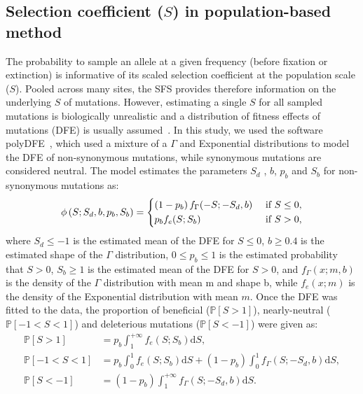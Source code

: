 \documentclass{article}
\newcommand{\der}{\textrm{d}}
\newcommand{\proba}{\mathbb{P}}
\newcommand{\Spop}{S}
\newcommand{\polyDel}{\Spop < -1}
\newcommand{\polyNeutral}{-1 < \Spop < 1}
\newcommand{\polyAdv}{ \Spop > 1}
\newcommand{\PpolyDel}{\proba \left[ \polyDel \right]}
\newcommand{\PpolyNeutral}{\proba \left[ \polyNeutral \right]}
\newcommand{\PpolyAdv}{\proba \left[ \polyAdv \right]}
\begin{document}
    \subsection{Selection coefficient ($\Spop$) in population-based method}
    \label{subsec:s-polymorphism-method}
    The probability to sample an allele at a given frequency (before fixation or extinction) is informative of its scaled selection coefficient at the population scale ($\Spop$).
    Pooled across many sites, the SFS provides therefore information on the underlying $\Spop$ of mutations.
    However, estimating a single $\Spop$ for all sampled mutations is biologically unrealistic and a distribution of fitness effects of mutations (DFE) is usually assumed~\cite{eyre-walker_distribution_2006a, eyre-walker_estimating_2009a}.
    In this study, we used the software polyDFE~\cite{tataru_inference_2017, tataru_polydfe_2020}, which used a mixture of a $\Gamma$ and Exponential distributions to model the DFE of non-synonymous mutations, while synonymous mutations are considered neutral.
    The model estimates the parameters $\Spop_d$ , $b$, $p_b$ and $\Spop_b$ for non-synonymous mutations as:
    \begin{equation}
        \phi \left( \Spop; \Spop_d , b, p_b, \Spop_b \right) =
        \begin{dcases}
            \left( 1 - p_b \right) f_{\Gamma}(-\Spop; -\Spop_d, b) & \text{ if $\Spop \leq 0$,} \\
            p_b f_{e}(\Spop; \Spop_b) & \text{ if $\Spop > 0$,} \\
        \end{dcases}
    \end{equation}
    where $\Spop_d \leq -1 $ is the estimated mean of the DFE for $\Spop \leq 0$,
    $b \geq 0.4$ is the estimated shape of the $\Gamma$ distribution,
    $0 \leq p_b \leq 1$ is the estimated probability that $\Spop > 0$,
    $\Spop_b \geq 1$ is the estimated mean of the DFE for $\Spop > 0$,
    and $f_{\Gamma}(x; m, b)$ is the density of the $\Gamma$ distribution with mean m and shape b, while $f_{e}(x; m)$ is the density of the Exponential distribution with mean $m$.
    Once the DFE was fitted to the data, the proportion of beneficial ($\PpolyAdv$), nearly-neutral ($\PpolyNeutral$) and deleterious mutations ($\PpolyDel$) were given as:
    \begin{align}
        \PpolyAdv &= p_b \int_{1}^{+\infty} f_{e}(\Spop; \Spop_b) \der \Spop,  \label{eq:polyProbaAdv} \\
        \PpolyNeutral &= p_b \int_{0}^{1} f_{e}(\Spop; \Spop_b) \der \Spop + \left( 1 - p_b \right) \int_{0}^{1} f_{\Gamma}(\Spop; -\Spop_d, b) \der \Spop, \\
        \PpolyDel &= \left( 1 - p_b \right) \int_{1}^{+\infty} f_{\Gamma}(\Spop; -\Spop_d, b) \der \Spop. \label{eq:polyProbaDel}
    \end{align}
\end{document}
